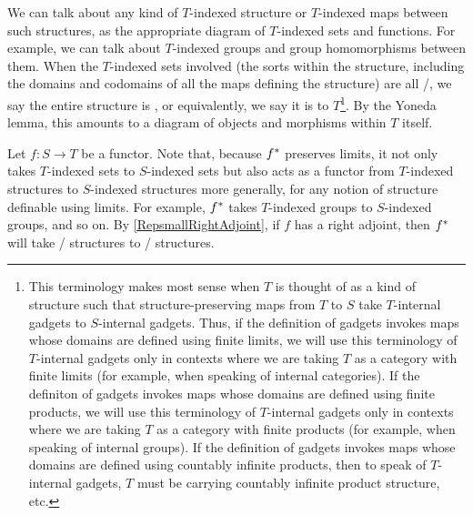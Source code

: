 \begin{definition}\label{IndexedStructuresDefn}
We can talk about any kind of $T$-indexed structure or $T$-indexed maps between such structures, as the appropriate diagram of $T$-indexed sets and functions. For example, we can talk about $T$-indexed groups and group homomorphisms between them. When the $T$-indexed sets involved (the sorts within the structure, including the domains and codomains of all the maps defining the structure) are all \repsmall/, we say the entire structure is , or equivalently, we say it is  to $T$\footnote{This  terminology makes most sense when $T$ is thought of as a kind of structure such that structure-preserving maps from $T$ to $S$ take $T$-internal gadgets to $S$-internal gadgets. Thus, if the definition of gadgets invokes maps whose domains are defined using finite limits, we will use this terminology of $T$-internal gadgets only in contexts where we are taking $T$ as a category with finite limits (for example, when speaking of internal categories). If the definiton of gadgets invokes maps whose domains are defined using finite products, we will use this terminology of $T$-internal gadgets only in contexts where we are taking $T$ as a category with finite products (for example, when speaking of internal groups). If the definition of gadgets invokes maps whose domains are defined using countably infinite products, then to speak of $T$-internal gadgets, $T$ must be carrying countably infinite product structure, etc.}. By the Yoneda lemma, this amounts to a diagram of objects and morphisms within $T$ itself.
\end{definition}

Let $f : S \to T$ be a functor. Note that, because $f^*$ preserves limits, it not only takes $T$-indexed sets to $S$-indexed sets but also acts as a functor from $T$-indexed structures to $S$-indexed structures more generally, for any notion of structure definable using limits. For example, $f^*$ takes $T$-indexed groups to $S$-indexed groups, and so on. By \cref{RepsmallRightAdjoint}, if $f$ has a right adjoint, then $f^*$ will take \repsmall/ structures to \repsmall/ structures.

